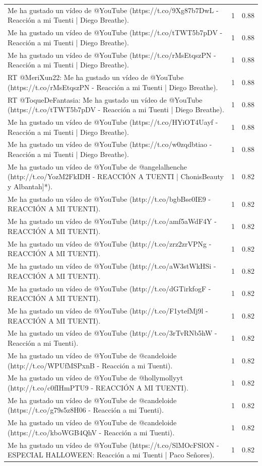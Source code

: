 \begin{longtable}{p{12.5cm}rr}
\bottomrule
\endlastfoot
Me ha gustado un vídeo de @YouTube (https://t.co/9Xg87b7DwL - Reacción a mi Tuenti | Diego Breathe). & 1 & 0.88 \\
Me ha gustado un vídeo de @YouTube (https://t.co/tTWT5b7pDV - Reacción a mi Tuenti | Diego Breathe). & 1 & 0.88 \\
Me ha gustado un vídeo de @YouTube (https://t.co/rMsEtqszPN - Reacción a mi Tuenti | Diego Breathe). & 1 & 0.88 \\
RT @MeriXun22: Me ha gustado un vídeo de @YouTube (https://t.co/rMsEtqszPN - Reacción a mi Tuenti | Diego Breathe). & 1 & 0.88 \\
RT @ToqueDeFantasia: Me ha gustado un vídeo de @YouTube (https://t.co/tTWT5b7pDV - Reacción a mi Tuenti | Diego Breathe). & 1 & 0.88 \\
Me ha gustado un vídeo de @YouTube (https://t.co/HYiOT4Uayf - Reacción a mi Tuenti | Diego Breathe). & 1 & 0.88 \\
Me ha gustado un vídeo de @YouTube (https://t.co/w0zqdbtiao - Reacción a mi Tuenti | Diego Breathe). & 1 & 0.88 \\
Me ha gustado un vídeo de @YouTube de @angelalhenche (http://t.co/YozM2FkIDH - REACCIÓN A TUENTI | ChonisBeauty y Albantah]*). & 1 & 0.82 \\
Me ha gustado un vídeo de @YouTube (http://t.co/bgbBse0IE9 - REACCIÓN A MI TUENTI). & 1 & 0.82 \\
Me ha gustado un vídeo de @YouTube (http://t.co/amf5aWdF4Y - REACCIÓN A MI TUENTI). & 1 & 0.82 \\
Me ha gustado un vídeo de @YouTube (http://t.co/zrz2zrVPNg - REACCIÓN A MI TUENTI). & 1 & 0.82 \\
Me ha gustado un vídeo de @YouTube (http://t.co/aW3stWkHSi - REACCIÓN A MI TUENTI). & 1 & 0.82 \\
Me ha gustado un vídeo de @YouTube (http://t.co/dGTirkfogF - REACCIÓN A MI TUENTI). & 1 & 0.82 \\
Me ha gustado un vídeo de @YouTube (http://t.co/F1ytefMj9l - REACCIÓN A MI TUENTI). & 1 & 0.82 \\
Me ha gustado un vídeo de @YouTube (http://t.co/3rTvRNb5hW - Reacción a mi Tuenti). & 1 & 0.82 \\
Me ha gustado un vídeo de @YouTube de @candeloide (http://t.co/WPUfMSPxnB - Reacción a mi Tuenti). & 1 & 0.82 \\
Me ha gustado un vídeo de @YouTube de @hollymollyyt (http://t.co/c0fIHmPTU9 - REACCIÓN A MI TUENTI). & 1 & 0.82 \\
Me ha gustado un vídeo de @YouTube de @candeloide (https://t.co/g79s5z8H06 - Reacción a mi Tuenti). & 1 & 0.82 \\
Me ha gustado un vídeo de @YouTube de @candeloide (https://t.co/kboWGB4QhV - Reacción a mi Tuenti). & 1 & 0.82 \\
Me ha gustado un vídeo de @YouTube (https://t.co/SlMOcFSlON - ESPECIAL HALLOWEEN: Reacción a mi Tuenti | Paco Señores). & 1 & 0.82 \\

\end{longtable}
\clearpage

